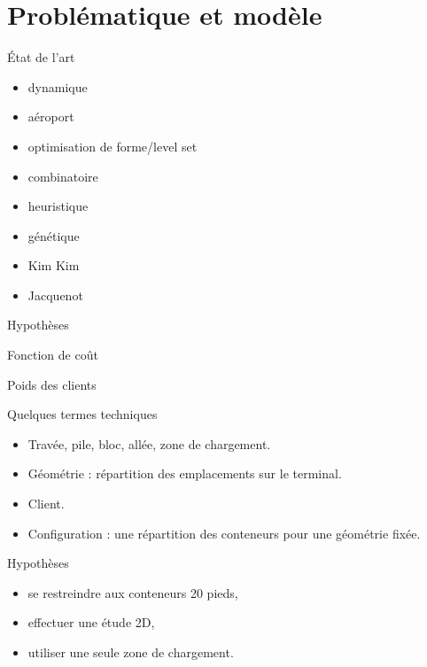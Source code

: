\section{Problématique et modèle}

\begin{frame}{\'Etat de l'art}
  \begin{itemize}
  \item dynamique
  \item aéroport \cite{gotteland2004}
  \item optimisation de forme/level set \cite{allaire2006}
  \item combinatoire
  \item heuristique
  \item génétique
  \item Kim Kim \cite{kim98}
  \item Jacquenot \cite{jacquenot2010}
  \end{itemize}
\end{frame}

\begin{frame}{Hypothèses}
\end{frame}

\begin{frame}{Fonction de coût}
\end{frame}

\begin{frame}{Poids des clients}
\end{frame} 

\begin{frame}{Quelques termes techniques}
  \vfill
  \begin{itemize}
  \item Travée, pile, bloc, allée, zone de chargement.
    \vfill
  \item Géométrie : répartition des emplacements sur le terminal.
    \vfill
  \item Client.
    \vfill
  \item Configuration : une répartition des conteneurs pour une géométrie fixée.
  \end{itemize}
  \vfill
\end{frame}

\begin{frame}{Hypothèses}
  \begin{itemize}
    \vfill
  \item se restreindre aux conteneurs 20 pieds,
    \vfill
  \item effectuer une étude 2D,
    \vfill
  \item utiliser une seule zone de chargement.
    \vfill
  \end{itemize}
  \vfill
\end{frame}

